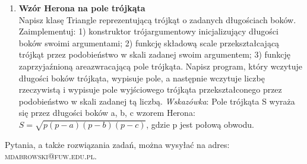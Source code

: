 \documentclass[12pt]{article}
\begin{document}
\begin{enumerate}
\item \textbf{Wzór Herona na pole trójkąta}\\
Napisz klasę \textsf{Triangle} reprezentującą trójkąt o zadanych długościach boków. Zaimplementuj: 1) konstruktor trójargumentowy inicjalizujący długości boków swoimi argumentami; 2) funkcję składową \textsf{scale} przekształcającą trójkąt przez podobieństwo w skali zadanej swoim argumentem; 3) funkcję zaprzyjaźnioną \textsf{area}zwracającą pole trójkąta. Napisz program, który wczytuje długości boków trójkąta, wypisuje pole, a następnie wczytuje liczbę rzeczywistą i wypisuje pole wyjściowego trójkąta przekształconego przez podobieństwo w skali zadanej tą liczbą. \textit{Wskazówka}: Pole trójkąta S wyraża się przez długości boków a, b, c wzorem Herona:
$S=\sqrt{p(p-a)(p-b)(p-c)}$, gdzie p jest połową obwodu.

\end{enumerate}
\vspace{1cm}
\small Pytania, a także rozwiązania zadań, można wysyłać na adres: \textsc{mdabrowski@fuw.edu.pl}.
\end{document}
